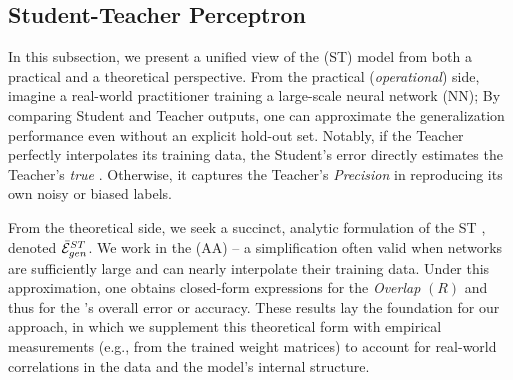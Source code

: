 \subsection{Student-Teacher Perceptron}
\label{sxn:SMOG_main-student_teacher}

In this subsection, we present a unified view of the \emph{\StudentTeacher} (ST) \Perceptron 
model from both a practical and a theoretical perspective.  
From the practical (\emph{operational}) side, imagine a real-world practitioner training a large-scale neural network (NN); 
By comparing Student and Teacher outputs, one can approximate the  generalization performance even without an explicit hold-out set.  
Notably, if the Teacher perfectly interpolates its training data, the Student’s error directly estimates the Teacher’s \emph{true} \GeneralizationAccuracy.
Otherwise, it captures the Teacher’s \emph{Precision} in reproducing its own noisy or biased labels.

From the theoretical side, we seek a succinct, analytic formulation of the ST \AverageGeneralizationError, denoted $\bar{\mathcal{E}}^{ST}_{gen}$.  
We work in the \AnnealedApproximation (AA) -- a simplification often valid when networks are sufficiently large and can nearly interpolate their training data. 
Under this approximation, one obtains closed-form expressions for the \StudentTeacher \emph{Overlap} $(R)$
and thus for the \Teacher’s overall error or accuracy.  
These results lay the foundation for our \emph{\SemiEmpirical} approach, in which we supplement this theoretical form with empirical measurements (e.g., from the trained weight matrices) to account for real-world correlations in the data and the model’s internal structure.  


